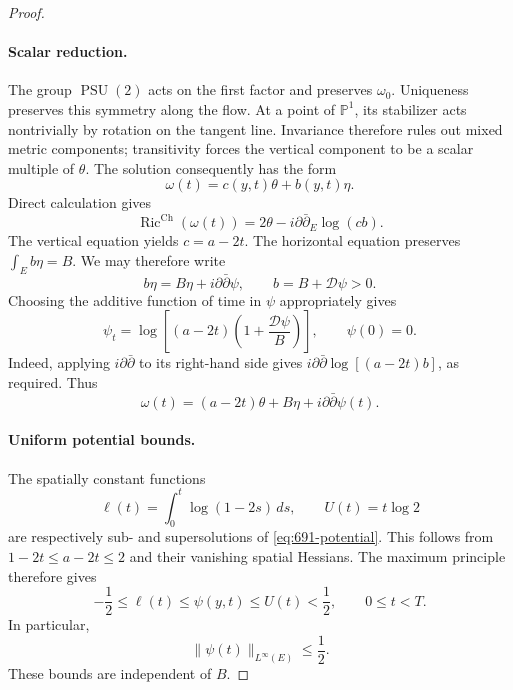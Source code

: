 \documentclass[11pt,a4paper]{article}
\theoremstyle{remark}
\begin{document}
\begin{proof}
\paragraph{Scalar reduction.}
The group $\operatorname{PSU}(2)$ acts on the first factor and preserves $\omega_0$. Uniqueness preserves this symmetry along the flow. At a point of $\mathbb P^1$, its stabilizer acts nontrivially by rotation on the tangent line. Invariance therefore rules out mixed metric components; transitivity forces the vertical component to be a scalar multiple of $\theta$. The solution consequently has the form
\[
 \omega(t)=c(y,t)\theta+b(y,t)\eta.
\]
Direct calculation gives
\[
 \operatorname{Ric}^{\mathrm{Ch}}(\omega(t))
 =2\theta-i\partial\bar\partial_E\log(cb).
\]
The vertical equation yields $c=a-2t$. The horizontal equation preserves $\int_E b\eta=B$. We may therefore write
\[
 b\eta=B\eta+i\partial\bar\partial\psi,
 \qquad b=B+\mathcal D\psi>0.
\]
Choosing the additive function of time in $\psi$ appropriately gives
\begin{equation}
 \psi_t=\log\left[(a-2t)\left(1+\frac{\mathcal D\psi}{B}\right)\right],
 \qquad \psi(0)=0.
 \label{eq:691-potential}
\end{equation}
Indeed, applying $i\partial\bar\partial$ to its right-hand side gives
$i\partial\bar\partial\log[(a-2t)b]$, as required. Thus
\begin{equation}
 \omega(t)=(a-2t)\theta+B\eta+i\partial\bar\partial\psi(t).
 \label{eq:691-solution-form}
\end{equation}

\paragraph{Uniform potential bounds.}
The spatially constant functions
\[
 \ell(t)=\int_0^t\log(1-2s)\,ds,
 \qquad U(t)=t\log2
\]
are respectively sub- and supersolutions of \eqref{eq:691-potential}. This follows from $1-2t\le a-2t\le2$ and their vanishing spatial Hessians. The maximum principle therefore gives
\[
 -\frac12\le\ell(t)\le\psi(y,t)\le U(t)<\frac12,
 \qquad 0\le t<T.
\]
In particular,
\begin{equation}
 \|\psi(t)\|_{L^\infty(E)}\le\frac12.
 \label{eq:691-potential-bound}
\end{equation}
These bounds are independent of $B$.


\end{proof}
\end{document}
